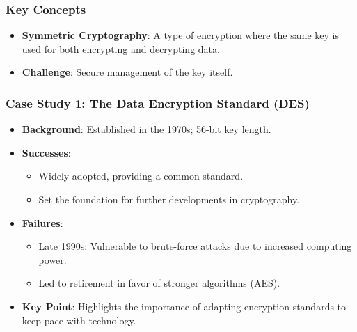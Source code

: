 \documentclass{beamer}
\begin{document}
\begin{frame}[fragile]
    \frametitle{Key Concepts}
    \begin{itemize}
        \item \textbf{Symmetric Cryptography}: A type of encryption where the same key is used for both encrypting and decrypting data.
        \item \textbf{Challenge}: Secure management of the key itself.
    \end{itemize}
\end{frame}

\begin{frame}[fragile]
    \frametitle{Case Study 1: The Data Encryption Standard (DES)}
    \begin{itemize}
        \item \textbf{Background}: Established in the 1970s; 56-bit key length.
        \item \textbf{Successes}:
            \begin{itemize}
                \item Widely adopted, providing a common standard.
                \item Set the foundation for further developments in cryptography.
            \end{itemize}
        \item \textbf{Failures}:
            \begin{itemize}
                \item Late 1990s: Vulnerable to brute-force attacks due to increased computing power.
                \item Led to retirement in favor of stronger algorithms (AES).
            \end{itemize}
        \item \textbf{Key Point}: Highlights the importance of adapting encryption standards to keep pace with technology.
    \end{itemize}
\end{frame}
\end{document}
